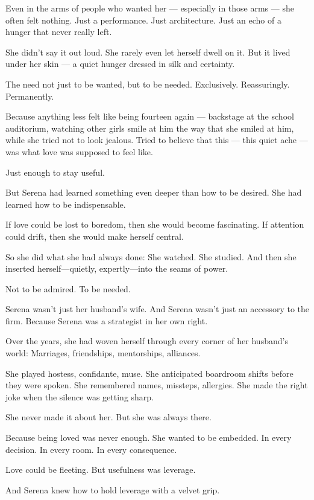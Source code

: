 Even in the arms of people who wanted her 
--- 
especially in those arms 
--- 
she often felt nothing.
Just a performance. Just architecture.
Just an echo of a hunger that never really left.

She didn’t say it out loud. She rarely even let herself dwell on it.
But it lived under her skin — a quiet hunger dressed in silk and certainty.

The need not just to be wanted, but to be needed.
Exclusively. Reassuringly. Permanently.

Because anything less felt like being fourteen again —
backstage at the school auditorium,
watching other girls smile at him the way that she smiled at him,
while she tried not to look jealous.
Tried to believe that this — this quiet ache — was what love was supposed to feel like.

Just enough to stay useful.








But Serena had learned something even deeper than how to be desired.
She had learned how to be indispensable.

If love could be lost to boredom, then she would become fascinating.
If attention could drift, then she would make herself central.

So she did what she had always done:
She watched.
She studied.
And then she inserted herself—quietly, expertly—into the seams of power.

Not to be admired.
To be needed.

Serena wasn’t just her husband’s wife.
And Serena wasn’t just an accessory to the firm.
Because Serena was a strategist in her own right.

Over the years, she had woven herself through every corner of her husband’s world:
Marriages, friendships, mentorships, alliances.

She played hostess, confidante, muse.
She anticipated boardroom shifts before they were spoken.
She remembered names, missteps, allergies.
She made the right joke when the silence was getting sharp.

She never made it about her.
But she was always there.

Because being loved was never enough.
She wanted to be embedded.
In every decision.
In every room.
In every consequence.

Love could be fleeting.
But usefulness was leverage.

And Serena knew how to hold leverage with a velvet grip.

